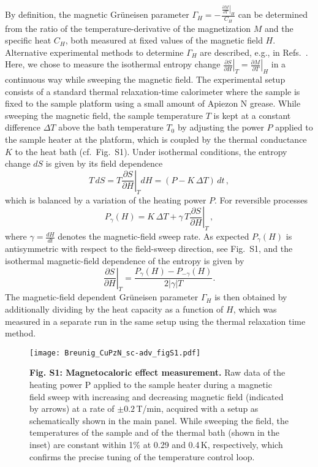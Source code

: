 \documentclass[12pt]{article}
\begin{document}
By definition, the magnetic Gr\"uneisen parameter 
	$\Gamma_H=-\frac{\left.\frac{\partial M}{\partial T}\right|_H}{C_H}$
	can be determined from the ratio of the temperature-derivative of the magnetization $M$ and the specific heat $C_H$, both measured at fixed values of the magnetic field $H$. Alternative experimental methods to determine $\Gamma_H$ are described, e.g., in Refs.~\cite{Rost2009,Tokiwa2011,Wolf2011}. Here, we chose to measure the isothermal entropy change $\left.\frac{\partial S}{\partial H}\right|_T=\left.\frac{\partial M}{\partial T}\right|_H$ in a continuous way while sweeping the magnetic field.  The experimental setup consists of a standard thermal relaxation-time calorimeter where the sample is fixed to the sample platform using a small amount of Apiezon N grease. While sweeping the magnetic field, the sample temperature $T$ is kept at a constant difference $\Delta T$ above the bath temperature $T_0$ by adjusting the power $P$ applied to the sample heater at the platform, which is coupled by the thermal conductance $K$ to the heat bath (cf.~Fig.~{S1}). 
Under isothermal conditions, the entropy change $dS$ is given by its field dependence 	 
   \begin{equation}\label{eqn:theory-mce-dE}
	 T\,dS = T\left.\frac{\partial S}{\partial H}\right|_T dH = (P-K\,\Delta T)\,dt\, ,
	\end{equation}
	which is balanced by a variation of the heating power $P$. For reversible processes 
	\begin{equation}
	  P_\gamma(H)=K\,\Delta T + \gamma\, T\left.\frac{\partial S}{\partial H}\right|_T\,,
	\end{equation}
where $\gamma=\frac{dH}{dt}$ denotes the magnetic-field sweep rate. As expected $P_\gamma(H)$ is antisymmetric with respect to the field-sweep direction, see Fig.~{S1}, and the isothermal magnetic-field dependence of the entropy is given by
	\begin{equation}
	  \left.\frac{\partial S}{\partial H}\right|_T = \frac{P_\gamma(H)-P_{-\gamma}(H)}{2\left|\gamma\right| T}.
	\end{equation}
	The magnetic-field dependent Gr\"uneisen parameter $\Gamma_H$ is then obtained by additionally dividing by the heat capacity as a function of $H$, which was measured in a separate run in the same setup using the thermal relaxation time method. 
	
\begin{figure}[t]
  \centering
  \texttt{[image: Breunig\_CuPzN\_sc-adv\_figS1.pdf]}
 \caption{{\bf Fig. S1: Magnetocaloric effect measurement.} Raw data of the heating power P applied to the sample heater during a magnetic field sweep with increasing and decreasing magnetic field (indicated by arrows) at a rate of $\pm 0.2\,$T/min, acquired with a setup as schematically shown in the main panel. While sweeping the field, the temperatures of the sample and of the thermal bath (shown in the inset) are constant within 1\% at 0.29 and 0.4\,K, respectively, which confirms the precise tuning of the temperature control loop.}
  \label{figmke}
\end{figure}	
	
\end{document}
